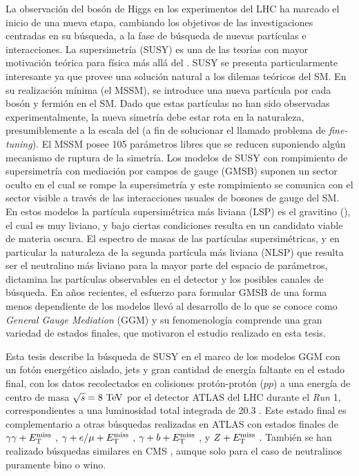 La observación del bosón de Higgs en los experimentos del LHC ha marcado el inicio de una
nueva etapa, cambiando los objetivos de las investigaciones centradas en su búsqueda, a la
fase de búsqueda de nuevas partículas e interacciones.
La supersimetría (SUSY)
\cite{Miyazawa:1966,Ramond:1971gb,Golfand:1971iw,Neveu:1971rx,Neveu:1971iv,Gervais:1971ji,Volkov:1973ix,Wess:1973kz,Wess:1974tw}
es una de las teorías con mayor motivación teórica para física más allá del
{\SM}. SUSY se presenta particularmente interesante ya que provee una
solución natural a los dilemas teóricos del SM.
En su realización mínima (el MSSM), se introduce
una nueva partícula por cada bosón y fermión en el SM. Dado que
estas partículas no han sido observadas experimentalmente, la nueva simetría debe
estar rota en la naturaleza, presumiblemente a la escala del {\tev} (a fin de solucionar el
llamado problema de \emph{fine-tuning}). El MSSM posee
105 parámetros libres que se reducen suponiendo algún mecanismo de ruptura de la simetría.
Los modelos de SUSY con rompimiento de supersimetría con
mediación por campos de gauge (GMSB)
\cite{Dine:1981gu,AlvarezGaume:1981wy,Nappi:1982hm,Dine:1993yw,Dine:1994vc,Dine:1995ag}
suponen un sector oculto en el cual se rompe la supersimetría y este rompimiento
se comunica con el sector visible a través de las interacciones
usuales de bosones de gauge del SM. En estos modelos la partícula supersimétrica más liviana
(LSP) es el gravitino (\gravino), el cual es muy liviano, y
bajo ciertas condiciones resulta en un candidato viable de materia oscura. El
espectro de masas de las partículas supersimétricas, y en particular
la naturaleza de la segunda partícula más liviana (NLSP) que resulta ser el
neutralino más liviano {\ninoone} para la mayor parte del espacio de parámetros,
dictamina las partículas observables en el detector y los posibles canales
de búsqueda.
En a\~nos recientes, el esfuerzo para formular GMSB de una
forma menos dependiente de los modelos llevó al desarrollo de lo que se conoce
como \emph{General Gauge Mediation} (GGM) \cite{GGM} y su fenomenología comprende
una gran variedad de estados finales, que motivaron el estudio realizado en esta
tesis.

Esta tesis describe la búsqueda de SUSY en el marco de los modelos GGM con
un fotón energético aislado, jets
y gran cantidad de energía faltante en el estado final, con los datos recolectados en colisiones
protón-protón ($pp$)
a una energía de centro de masa $\sqrt{s} = 8 \tev$ por el detector
ATLAS del LHC durante el \emph{Run} 1, correspondientes a una luminosidad total
integrada de 20.3 \ifb. Este estado final es complementario a otras búsquedas
realizadas en ATLAS con estados finales de $\gamma\gamma+E_{\mathrm{T}}^{\mathrm{miss}}$ \cite{Aad2012519,ATLAS-CONF-2014-001},
$\gamma+e/\mu+E_{\mathrm{T}}^{\mathrm{miss}}$ \cite{ATLAS-CONF-2012-144}, $\gamma+b+E_{\mathrm{T}}^{\mathrm{miss}}$
\cite{Aad:2012jva}, y $Z+E_{\mathrm{T}}^{\mathrm{miss}}$ \cite{ATLAS-CONF-2012-152}.
También se han realizado búsquedas similares en CMS \cite{CMS-PAS-SUS-12-018,CMS-PAS-SUS-14-004},
aunque solo para el caso de neutralinos puramente bino o wino.


